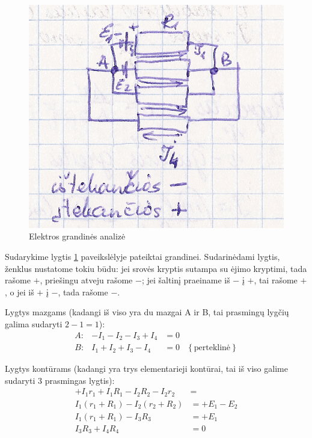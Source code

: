 \begin{figure}[H]
  \begin{center}
    \includegraphics[height=0.5\textwidth]{images/grandine1.png}
  \end{center}
  \caption{Elektros grandinės analizė}
  \label{fig:grandine1}
\end{figure}

\begin{exmp}
  Sudarykime lygtis \ref{fig:grandine1} paveikslėlyje pateiktai grandinei.
  Sudarinėdami lygtis, ženklus nustatome tokiu būdu: jei srovės kryptis
  sutampa su ėjimo kryptimi, tada rašome $+$, priešingu atveju rašome
  $-$; jei šaltinį praeiname iš $-$ į $+$, tai rašome $+$, o jei
  iš $+$ į $-$, tada rašome $-$.

  Lygtys mazgams (kadangi iš viso yra du mazgai A ir B, tai prasmingų
  lygčių galima sudaryti $2 - 1 = 1$):
  \begin{align*}
    A: & -I_{1} - I_{2} - I_{3} + I_{4} &= 0 \\
    B: & I_{1} + I_{2} + I_{3} - I_{4} &= 0 &
      \left\{ \text{perteklinė} \right\}
  \end{align*}
  
  Lygtys kontūrams (kadangi yra trys elementarieji kontūrai, tai iš
  viso galime sudaryti 3 prasmingas lygtis):
  \begin{align*}
    +I_{1}r_{1} + I_{1}R_{1} - I_{2}R_{2} - I_{2}r_{2} &= \\
      I_{1} (r_{1} + R_{1}) - I_{2} (r_{2} + R_{2}) &=
      + E_{1} - E_{2} \\
    I_{1} \left( r_{1} + R_{1} \right) - I_{3} R_{3} &= + E_{1} \\
    I_{3} R_{3} + I_{4} R_{4} &= 0
  \end{align*}
\end{exmp}
